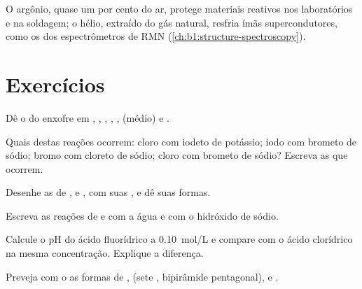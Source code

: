 O argônio, quase um por cento do ar, protege materiais reativos nos
laboratórios e na soldagem; o hélio, extraído do gás natural, resfria
ímãs supercondutores, como os dos espectrômetros de RMN (\cref{ch:b1:structure-spectroscopy}).

\section{Exercícios}

\begin{exercise}[$\star$]\label{exo:b1:p-block-16-18:1}
Dê o  do enxofre em , , ,
, ,  (médio) e .
\end{exercise}

\begin{exercise}[$\star$]\label{exo:b1:p-block-16-18:2}
Quais destas reações ocorrem: cloro com iodeto de potássio; iodo com
brometo de sódio; bromo com cloreto de sódio; cloro com brometo de sódio?
Escreva as que ocorrem.
\end{exercise}

\begin{exercise}[$\star$]\label{exo:b1:p-block-16-18:3}
Desenhe as  de ,  e , com suas
, e dê suas formas.
\end{exercise}

\begin{exercise}[$\star$]\label{exo:b1:p-block-16-18:4}
Escreva as reações de  e  com a água e com o hidróxido
de sódio.
\end{exercise}

\begin{exercise}[$\star\star$]\label{exo:b1:p-block-16-18:5}
Calcule o pH do ácido fluorídrico a \qty{0.10}{mol/L} e compare com o
ácido clorídrico na mesma concentração. Explique a diferença.
\end{exercise}

\begin{exercise}[$\star\star$]\label{exo:b1:p-block-16-18:6}
Preveja com o  as formas de ,  (sete , bipirâmide pentagonal),  e .
\end{exercise}

